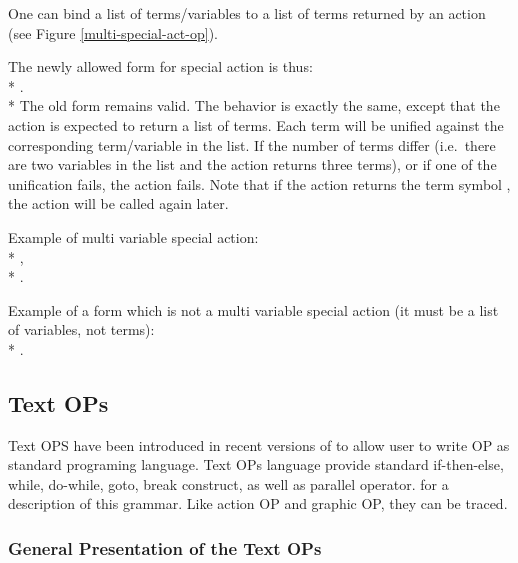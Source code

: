
One can bind a list of terms/variables to a list of
terms returned by an action (see Figure \ref{multi-special-act-op}).

The newly allowed form for special action is thus: \\*
.\\*
The old form remains valid. The behavior is exactly the same, except that
the action is expected to return a list of terms. Each term will be
unified against the corresponding term/variable in the list. If the number
of terms differ (i.e.\ there are two variables in the list and the action
returns three terms), or if one of the unification fails, the action
fails. Note that if the action returns the term symbol , the
action will be called again later.

Example of multi variable special action:\\*
,\\*
.

Example of a form which is not a multi variable special action (it must be a
list of variables, not terms):\\*
.


\subsection{Text OPs}

Text OPS have been introduced in recent versions of \COPRS{} to allow user to
write OP as standard programing language. Text OPs language provide standard
if-then-else, while, do-while, goto, break construct, as well as parallel
operator.   for a
description of this grammar. Like action OP and graphic OP, they can be traced.



\subsubsection{General Presentation of the Text OPs}

